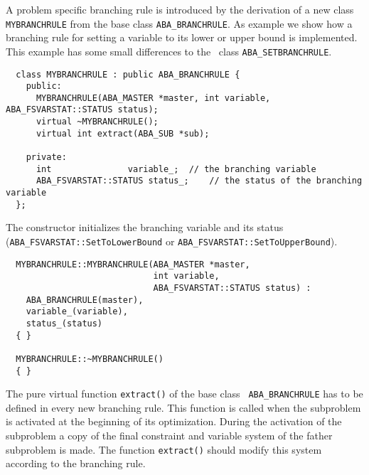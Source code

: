 A problem specific branching rule is introduced by the derivation of
a new class {\tt MYBRANCHRULE} from the base class {\tt ABA\_BRANCHRULE}.
As example we show how a branching rule for setting a variable to its
lower or upper bound is implemented. This example has some small
differences to the \ABACUS\ class {\tt ABA\_SETBRANCHRULE}.
\begin{verbatim}
  class MYBRANCHRULE : public ABA_BRANCHRULE {
    public:
      MYBRANCHRULE(ABA_MASTER *master, int variable, ABA_FSVARSTAT::STATUS status);
      virtual ~MYBRANCHRULE();
      virtual int extract(ABA_SUB *sub);

    private:
      int               variable_;  // the branching variable
      ABA_FSVARSTAT::STATUS status_;    // the status of the branching variable
  };
\end{verbatim}
The constructor initializes the branching variable and its status
({\tt ABA\_FSVARSTAT::SetToLowerBound} or {\tt ABA\_FSVARSTAT::SetToUpperBound}).
\begin{verbatim}
  MYBRANCHRULE::MYBRANCHRULE(ABA_MASTER *master, 
                             int variable, 
                             ABA_FSVARSTAT::STATUS status) : 
    ABA_BRANCHRULE(master),
    variable_(variable),
    status_(status)
  { }

  MYBRANCHRULE::~MYBRANCHRULE()
  { }
\end{verbatim}
The pure virtual function {\tt extract()} of the base class {\tt
  ABA\_BRANCHRULE} has to be defined in every new branching rule. This
  function is called when the subproblem is activated at the beginning
  of its optimization. During the activation of the subproblem a copy
  of the final constraint and variable system of the father subproblem
  is made. The function {\tt extract()} should modify this system
  according to the branching rule. 

